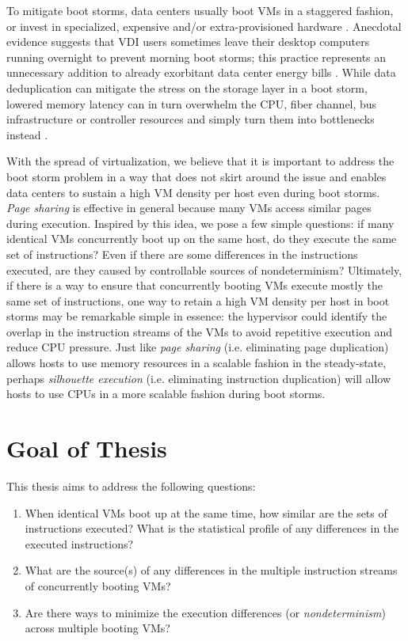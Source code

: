 To mitigate boot storms, data centers usually
boot VMs in a staggered fashion, or invest in specialized,
expensive and/or extra-provisioned hardware \cite{highperfnas, liao2011vmstore}.
Anecdotal evidence suggests that VDI users sometimes leave their desktop computers running
overnight to prevent morning boot storms; this practice
represents an unnecessary addition to already exorbitant
data center energy bills \cite{qureshi2009bills}. 
While data deduplication \cite{clements2009deduplication}
can mitigate the stress on the storage layer in
a boot storm, lowered memory latency can in turn overwhelm the CPU, 
fiber channel, bus infrastructure or controller resources 
and simply turn them into bottlenecks instead \cite{netappstorm}. 

With the spread of virtualization, we believe that it is important to address the
boot storm problem in a way that does not skirt around the issue
and enables data centers to sustain a high VM density per host even
during boot storms. {\em Page sharing} is effective
in general because many VMs access similar pages during execution.
Inspired by this idea, we pose a few simple questions: 
if many identical VMs concurrently boot up on the same host,
do they execute the same set of instructions? Even if there are
some differences in the instructions executed, are they caused by
controllable sources of nondeterminism? Ultimately, if there is a way
to ensure that concurrently booting VMs execute mostly the same set of instructions,
 one way to retain a high VM density 
per host in boot storms may be remarkable simple in essence:
the hypervisor could identify the overlap in the instruction streams of 
the VMs to avoid repetitive execution and reduce
CPU pressure. Just like {\em page sharing} (i.e. eliminating page
duplication) allows hosts to use memory resources in a scalable fashion in
the steady-state, perhaps {\em silhouette execution} (i.e. eliminating
instruction duplication) will allow hosts to use CPUs in a more scalable fashion during boot storms.

\section{Goal of Thesis}
This thesis aims to address the following questions:

\begin{enumerate}

\item When identical VMs boot up at the same time, how similar
are the sets of instructions executed? What is the statistical
profile of any differences in the executed instructions?

\item What are the source(s) of any differences in
the multiple instruction streams of concurrently booting VMs?

\item Are there ways to minimize the execution differences (or {\em nondeterminism})
across multiple booting VMs?

\end{enumerate}

